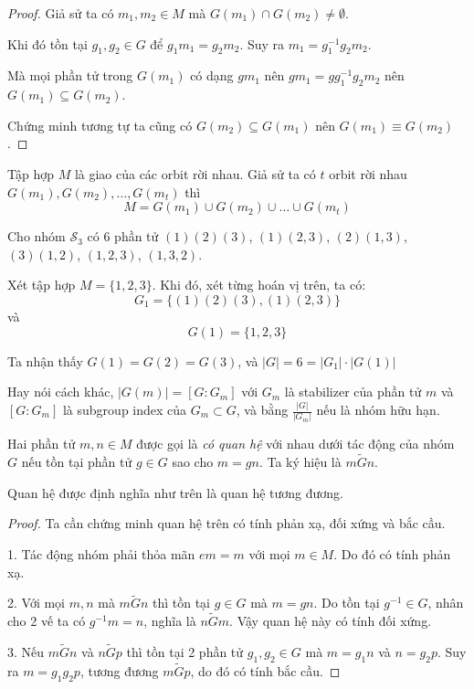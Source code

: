 \begin{proof}
    Giả sử ta có $m_1, m_2 \in M$ mà $G(m_1) \cap G(m_2) \neq \emptyset$.

    Khi đó tồn tại $g_1, g_2 \in G$ để $g_1 m_1 = g_2 m_2$. Suy ra $m_1 = g_1^{-1} g_2 m_2$.

    Mà mọi phần tử trong $G(m_1)$ có dạng $g m_1$ nên $g m_1 = g g_1^{-1} g_2 m_2$ nên $G(m_1) \subseteq G(m_2)$.

    Chứng minh tương tự ta cũng có $G(m_2) \subseteq G(m_1)$ nên $G(m_1) \equiv G(m_2)$.
\end{proof}

\begin{corollary}
    Tập hợp $M$ là giao của các orbit rời nhau. Giả sử ta có $t$ orbit rời nhau $G(m_1), G(m_2), \ldots, G(m_t)$ thì
    \[M = G(m_1) \cup G(m_2) \cup \ldots \cup G(m_t)\]
\end{corollary}

\begin{example}
    Cho nhóm $\mathcal{S}_3$ có 6 phần tử $(1)(2)(3)$, $(1)(2,3)$, $(2)(1,3)$, $(3)(1,2)$, $(1,2,3)$, $(1,3,2)$.

    Xét tập hợp $M = \{1, 2, 3\}$. Khi đó, xét từng hoán vị trên, ta có:
    \[G_1 = \{(1)(2)(3), (1)(2,3)\}\]
    và
    \[G(1) = \{ 1, 2, 3 \}\]
\end{example}

Ta nhận thấy $G(1) = G(2) = G(3)$, và $\lvert G \rvert = 6 = \lvert G_1 \rvert \cdot \lvert G(1) \rvert$

Hay nói cách khác, $\lvert G(m) \rvert = [G: G_m]$ với $G_m$ là stabilizer của phần tử $m$ và $[G: G_m]$ là subgroup index của $G_m \subset G$, và bằng $\frac{\lvert G \rvert}{\lvert G_m \rvert}$ nếu là nhóm hữu hạn.

\begin{definition}
    Hai phần tử $m, n \in M$ được gọi là \textit{có quan hệ} với nhau dưới tác động của nhóm $G$ nếu tồn tại phần tử $g \in G$ sao cho $m = g n$.
    Ta ký hiệu là $m \tilde{G} n$.
\end{definition}

\begin{remark}
    Quan hệ được định nghĩa như trên là quan hệ tương đương.
\end{remark}

\begin{proof}
    Ta cần chứng minh quan hệ trên có tính phản xạ, đối xứng và bắc cầu.
    
    1. Tác động nhóm phải thỏa mãn $e m = m$ với mọi $m \in M$. Do đó có tính phản xạ.

    2. Với mọi $m, n$ mà $m \tilde{G} n$ thì tồn tại $g \in G$ mà $m = gn$. Do tồn tại $g^{-1} \in G$, nhân cho 2 vế ta có $g^{-1} m = n$, nghĩa là
    $n \tilde{G} m$. Vậy quan hệ này có tính đối xứng.

    3. Nếu $m \tilde{G} n$ và $n \tilde{G} p$ thì tồn tại 2 phần tử $g_1, g_2 \in G$ mà $m = g_1 n$ và $n = g_2 p$.
    Suy ra $m = g_1 g_2 p$, tương đương $m \tilde{G} p$, do đó có tính bắc cầu.
\end{proof}

